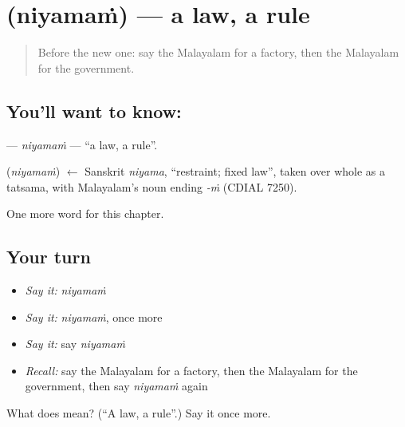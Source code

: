 \section[\texorpdfstring{\ml{നിയമം} (niyamaṁ)}{നിയമം (niyamaṁ)}]{ (niyamaṁ) — a law, a rule}

\label{lesson:ML-C299-niyamam}



\begin{quote}
Before the new one: say the Malayalam for a factory, then the Malayalam for the government.
\end{quote}

\subsection*{You'll want to know: }
\textbf{} — \emph{niyamaṁ} — \textquotedblleft{}a law, a rule\textquotedblright{}.

\begin{cousinweb}
\textbf{} (\emph{niyamaṁ}) $\leftarrow$ Sanskrit \emph{niyama}, \textquotedblleft{}restraint; fixed law\textquotedblright{}, taken over whole as a tatsama, with Malayalam's noun ending \emph{-ṁ} (CDIAL 7250).
\end{cousinweb}

\begin{grammarlens}[title={What you've built}]
One more word for this chapter.
\end{grammarlens}

\subsection*{Your turn}
\begin{itemize}
\raggedright
  \item \emph{Say it:} \emph{niyamaṁ}
  \item \emph{Say it:} \emph{niyamaṁ}, once more
  \item \emph{Say it:} say \emph{niyamaṁ}
  \item \emph{Recall:} say the Malayalam for a factory, then the Malayalam for the government, then say \emph{niyamaṁ} again
\end{itemize}

\begin{tcolorbox}[breakable,colback=teal!4,colframe=teal!35!black,title={Before you move on}]
What does  mean? (\textquotedblleft{}A law, a rule\textquotedblright{}.) Say it once more.
\end{tcolorbox}
